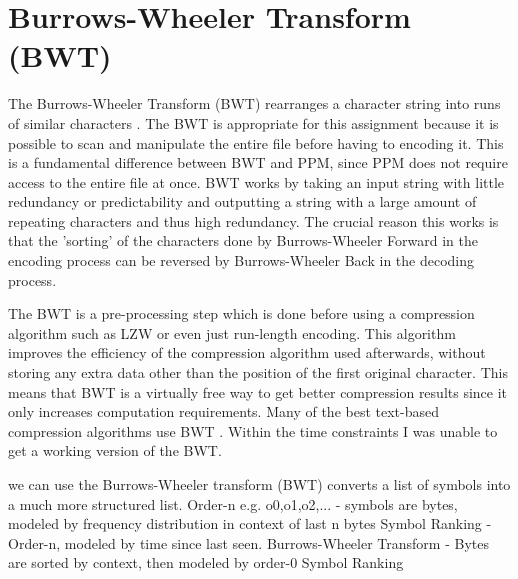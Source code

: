\documentclass[a4paper, 11pt]{article}
\numberwithin{equation}{section}
\theoremstyle{plain}
\theoremstyle{definition}
\begin{document}
\section{Burrows-Wheeler Transform (BWT)}
The Burrows-Wheeler Transform (BWT) rearranges a character string into runs of similar characters \cite{burrows1994block}. 
The BWT is appropriate for this assignment because it is possible to scan and manipulate the entire file 
before having to encoding it. 
This is a fundamental difference between BWT and PPM, since PPM does not require access to the entire file 
at once. 
BWT works by taking an input string with little redundancy or predictability and outputting a string with 
a large amount of repeating characters and thus high redundancy. 
The crucial reason this works is that the 'sorting' of the characters done by Burrows-Wheeler Forward 
in the encoding process can be reversed by Burrows-Wheeler Back in the decoding process. 

The BWT is a pre-processing step which is done before using a compression algorithm such as LZW or 
even just run-length encoding. 
This algorithm improves the efficiency of the compression algorithm used afterwards, without storing 
any extra data other than the position of the first original character. 
This means that BWT is a virtually free way to get better compression results since it only increases 
computation requirements. 
Many of the best text-based compression algorithms use BWT \cite{TextBenchmark}. 
Within the time constraints I was unable to get a working version of the BWT. 

we can use the Burrows-Wheeler transform (BWT) converts a list of symbols into a much more structured list.
Order-n e.g. o0,o1,o2,... - symbols are bytes, modeled by frequency distribution in context of last n bytes
Symbol Ranking - Order-n, modeled by time since last seen.
Burrows-Wheeler Transform - Bytes are sorted by context, then modeled by order-0 Symbol Ranking
\end{document}

